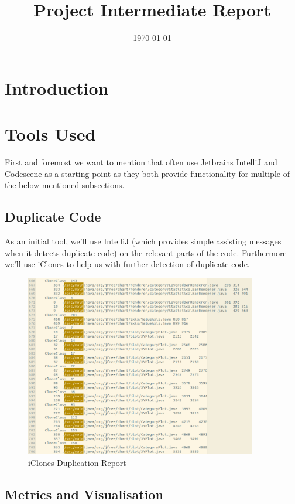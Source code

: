 \documentclass{article}
\title{\textmd{\textbf{Project Intermediate Report}}\\\normalsize\vspace{0.1in}\Large{\projectnaam}}
\author{\student}\date{\today}
\begin{document}
\maketitle
\newpage

\section{Introduction}

\section{Tools Used}

First and foremost we want to mention that often use Jetbrains IntelliJ and Codescene as a starting point as they both provide functionality for multiple of the below mentioned subsections.

\subsection{Duplicate Code}

As an initial tool, we'll use IntelliJ (which provides simple assisting messages when it detects duplicate code) on the relevant parts of the code. Furthermore we'll use iClones to help us with further detection of duplicate code.

\begin{figure}[H]
\centering
	\includegraphics[width=0.9\textwidth]{iclones_dup.png}
	\caption{iClones Duplication Report}
\end{figure}

\subsection{Metrics and Visualisation}
\end{document}
